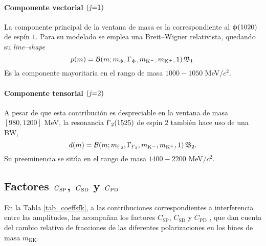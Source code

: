 \paragraph{Componente vectorial $\text{(\textit{j}}\text{=}\text{1)}$}
La componente principal de la ventana de masa es la correspondiente al $\upphi(1020)$ de espín $1$. Para su modelado se emplea una Breit--Wigner relativista, quedando su \emph{line--shape}
\begin{equation}
	p(m) = \mathcal{B}(m;m_{\upphi},\Gamma_{\upphi},m_{\text{K}{}^{-}},m_{\text{K}{}^{+}},1) \, \mathfrak{B}_1.
\end{equation}
Es la componente mayoritaria en el rango de masa $1000-1050$ MeV$/c^2$.


\paragraph{Componente tensorial $\text{(\textit{j}}\text{=}\text{2)}$}
A pesar de que esta contribución es despreciable en la ventana de masa $[980,1200]$ MeV, la resonancia $\text{f'}_2(1525)$ de espín $2$ también hace uso de una BW,
\begin{equation}
	d(m) = \mathcal{B}(m;m_{\text{f'}_2},\Gamma_{\text{f'}_2},m_{\text{K}{}^{-}},m_{\text{K}{}^{+}},1) \, \mathfrak{B}_2.
\end{equation}
Su preeminencia se sitúa en el rango de masa $1400-2200$ MeV$/c^2$.





\subsection{Factores 
$\text{\textit{C}}_{\text{SP}}$, $\text{\textit{C}}_{\text{SD}}$ y $\text{\textit{C}}_{\text{PD}}$
}

\label{sec_factorescspcspdcssd}

En la Tabla \ref{tab_coeffsfk}, a las contribuciones correspondientes a interferencia entre las amplitudes, las acompañan los factores $C_{\text{SP}}$, $C_{\text{SD}}$ y $C_{\text{PD}}$ , que dan cuenta del cambio relativo de fracciones de las diferentes polarizaciones en los bines de masa $m_{\text{KK}}$.

